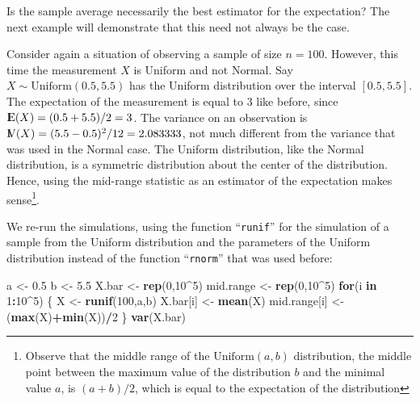 \documentclass[]{krantz}
\makeatletter
\newenvironment{Shaded}{\begin{snugshade}}{\end{snugshade}}
\newcommand{\KeywordTok}[1]{\textcolor[rgb]{0.13,0.29,0.53}{\textbf{#1}}}
\newcommand{\DecValTok}[1]{\textcolor[rgb]{0.00,0.00,0.81}{#1}}
\newcommand{\FloatTok}[1]{\textcolor[rgb]{0.00,0.00,0.81}{#1}}
\newcommand{\StringTok}[1]{\textcolor[rgb]{0.31,0.60,0.02}{#1}}
\newcommand{\ControlFlowTok}[1]{\textcolor[rgb]{0.13,0.29,0.53}{\textbf{#1}}}
\newcommand{\OperatorTok}[1]{\textcolor[rgb]{0.81,0.36,0.00}{\textbf{#1}}}
\newcommand{\NormalTok}[1]{#1}
\newcommand{\Expec}{{\rm I\kern-.3em E}}
\newcommand{\Var}{{\rm I\kern-.3em V}}
\newenvironment{kframe}{%
\medskip{}
\setlength{\fboxsep}{.8em}
 \def\at@end@of@kframe{}%
 \ifinner\ifhmode%
  \def\at@end@of@kframe{\end{minipage}}%
  \begin{minipage}{\columnwidth}%
 \fi\fi%
 \def\FrameCommand##1{\hskip\@totalleftmargin \hskip-\fboxsep
 \colorbox{shadecolor}{##1}\hskip-\fboxsep
     \hskip-\linewidth \hskip-\@totalleftmargin \hskip\columnwidth}%
 \MakeFramed {\advance\hsize-\width
   \@totalleftmargin\z@ \linewidth\hsize
   \@setminipage}}%
 {\par\unskip\endMakeFramed%
 \at@end@of@kframe}
\renewenvironment{Shaded}{\begin{kframe}}{\end{kframe}}
\theoremstyle{definition}
\theoremstyle{definition}
\theoremstyle{definition}
\theoremstyle{remark}
\makeatother
\begin{document}
Is the sample average necessarily the best estimator for the
expectation? The next example will demonstrate that this need not always
be the case.

Consider again a situation of observing a sample of size \(n=100\).
However, this time the measurement \(X\) is Uniform and not Normal. Say
\(X \sim \mathrm{Uniform}(0.5,5.5)\) has the Uniform distribution over
the interval \([0.5, 5.5]\). The expectation of the measurement is equal
to 3 like before, since \(\Expec(X) = (0.5+5.5)/2 = 3\). The variance on
an observation is \(\Var(X) = (5.5 - 0.5)^2/12 = 2.083333\), not much
different from the variance that was used in the Normal case. The
Uniform distribution, like the Normal distribution, is a symmetric
distribution about the center of the distribution. Hence, using the
mid-range statistic as an estimator of the expectation makes
sense\footnote{Observe that the middle range of the
  \(\mathrm{Uniform}(a,b)\) distribution, the middle point between the
  maximum value of the distribution \(b\) and the minimal value \(a\),
  is \((a+b)/2\), which is equal to the expectation of the distribution}.

We re-run the simulations, using the function ``\texttt{runif}'' for the
simulation of a sample from the Uniform distribution and the parameters
of the Uniform distribution instead of the function ``\texttt{rnorm}''
that was used before:

\begin{Shaded}
\begin{Highlighting}[]
\NormalTok{a <-}\StringTok{ }\FloatTok{0.5}
\NormalTok{b <-}\StringTok{ }\FloatTok{5.5}
\NormalTok{X.bar <-}\StringTok{ }\KeywordTok{rep}\NormalTok{(}\DecValTok{0}\NormalTok{,}\DecValTok{10}\OperatorTok{^}\DecValTok{5}\NormalTok{)}
\NormalTok{mid.range <-}\StringTok{ }\KeywordTok{rep}\NormalTok{(}\DecValTok{0}\NormalTok{,}\DecValTok{10}\OperatorTok{^}\DecValTok{5}\NormalTok{)}
\ControlFlowTok{for}\NormalTok{(i }\ControlFlowTok{in} \DecValTok{1}\OperatorTok{:}\DecValTok{10}\OperatorTok{^}\DecValTok{5}\NormalTok{) \{}
\NormalTok{  X <-}\StringTok{ }\KeywordTok{runif}\NormalTok{(}\DecValTok{100}\NormalTok{,a,b)}
\NormalTok{  X.bar[i] <-}\StringTok{ }\KeywordTok{mean}\NormalTok{(X)}
\NormalTok{  mid.range[i] <-}\StringTok{ }\NormalTok{(}\KeywordTok{max}\NormalTok{(X)}\OperatorTok{+}\KeywordTok{min}\NormalTok{(X))}\OperatorTok{/}\DecValTok{2}
\NormalTok{\}}
\KeywordTok{var}\NormalTok{(X.bar)}
\end{Highlighting}
\end{Shaded}
\end{document}
